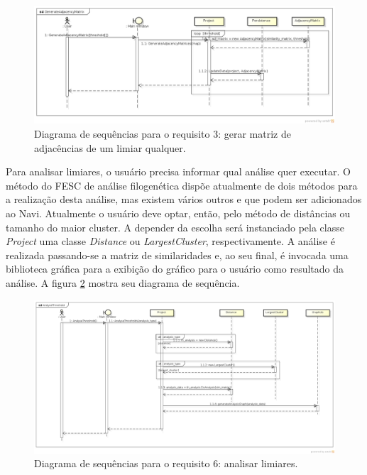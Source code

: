 \begin{figure}
\centering
\includegraphics[scale=0.42]{generate-adjacency-matrix}
\caption{Diagrama de sequências para o requisito 3: gerar matriz de adjacências de um limiar qualquer.}
\label{fig:generate-adjacency-matrix}
\end{figure}

Para analisar limiares, o usuário precisa informar qual análise quer executar. O método do FESC de análise filogenética dispõe atualmente de dois métodos
para a realização desta análise, mas existem vários outros e que podem ser adicionados ao Navi. Atualmente o usuário deve optar, então, pelo método de
distâncias ou tamanho do maior cluster. A depender da escolha será instanciado pela classe \textit{Project} uma classe \textit{Distance} ou
\textit{LargestCluster}, respectivamente. A análise é realizada passando-se a matriz de similaridades e, ao seu final, é invocada uma biblioteca gráfica
para a exibição do gráfico para o usuário como resultado da análise. A figura \ref{fig:analyse-threshold} mostra seu diagrama de sequência. \newline

\begin{figure}
\centering
\includegraphics[scale=0.34]{analyse-threshold}
\caption{Diagrama de sequências para o requisito 6: analisar limiares.}
\label{fig:analyse-threshold}
\end{figure}

